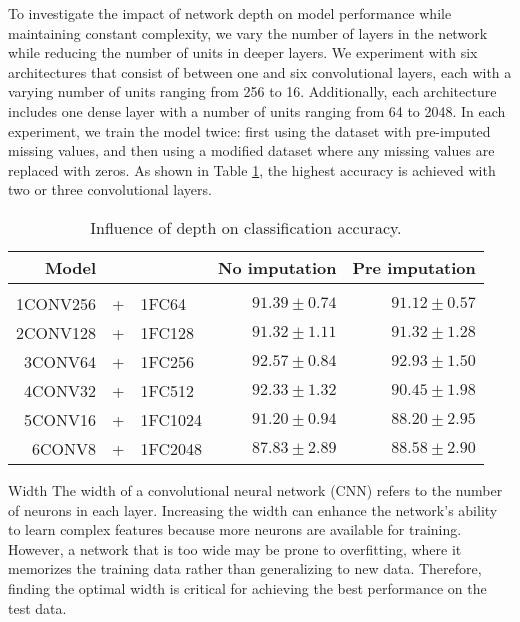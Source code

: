 To investigate the impact of network depth on model performance while maintaining constant complexity, we vary the number of layers in the network while reducing the number of units in deeper layers.
We experiment with six architectures that consist of between one and six convolutional layers, each with a varying number of units ranging from 256 to 16.
Additionally, each architecture includes one dense layer with a number of units ranging from 64 to 2048. 
In each experiment, we train the model twice: first using the dataset with pre-imputed missing values, and then using a modified dataset where any missing values are replaced with zeros.
As shown in Table \ref{tab:temCNNdepth}, the highest accuracy is achieved with two or three convolutional layers.

\begin{table}[H]
  \centering
   \begin{tabular}{rclrr}
   Model&&                  & No imputation         & Pre imputation             \\[0.2cm]
   \hline \\[-0.2cm]
   1CONV256 &+& 1FC64   	 & $91.39 \pm 0.74$ 	 & $91.12 \pm 0.57$\\
   2CONV128 &+& 1FC128  	 & $91.32 \pm 1.11$ 	 & $91.32 \pm 1.28$\\
   3CONV64 &+& 1FC256   	 & $\mathbf{92.57 \pm 0.84}$ 	 & $\mathbf{92.93 \pm 1.50}$\\
   4CONV32 &+& 1FC512   	 & $92.33 \pm 1.32$ 	 & $90.45 \pm 1.98$\\
   5CONV16 &+& 1FC1024  	 & $91.20 \pm 0.94$ 	 & $88.20 \pm 2.95$\\
   6CONV8 &+& 1FC2048   	 & $87.83 \pm 2.89$ 	 & $88.58 \pm 2.90$\\
   \end{tabular}
   \caption{Influence of depth on classification accuracy.}
   \label{tab:temCNNdepth}
 \end{table}

\begin{paragraph}{Width}
The width of a convolutional neural network (CNN) refers to the number of neurons in each layer.
Increasing the width can enhance the network's ability to learn complex features because more neurons are available for training.
However, a network that is too wide may be prone to overfitting, where it memorizes the training data rather than generalizing to new data.
Therefore, finding the optimal width is critical for achieving the best performance on the test data.
\end{paragraph}

